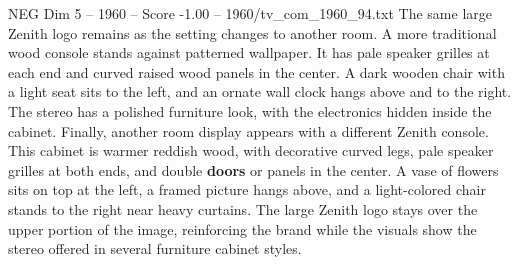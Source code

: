 \begin{textsample}{NEG Dim 5 – 1960 – Score -1.00 – 1960/tv\_com\_1960\_94.txt}
The same large Zenith logo remains as the setting changes to another room.
A more traditional wood console stands against patterned wallpaper.
It has pale speaker grilles at each end and curved raised wood panels in the center.
A dark wooden chair with a light seat sits to the left, and an ornate wall clock hangs above and to the right.
The stereo has a polished furniture look, with the electronics hidden inside the cabinet.
Finally, another room display appears with a different Zenith console.
This cabinet is warmer reddish wood, with decorative curved legs, pale speaker grilles at both ends, and double \textbf{doors} or panels in the center.
A vase of flowers sits on top at the left, a framed picture hangs above, and a light-colored chair stands to the right near heavy curtains.
The large Zenith logo stays over the upper portion of the image, reinforcing the brand while the visuals show the stereo offered in several furniture cabinet styles.

\end{textsample}
